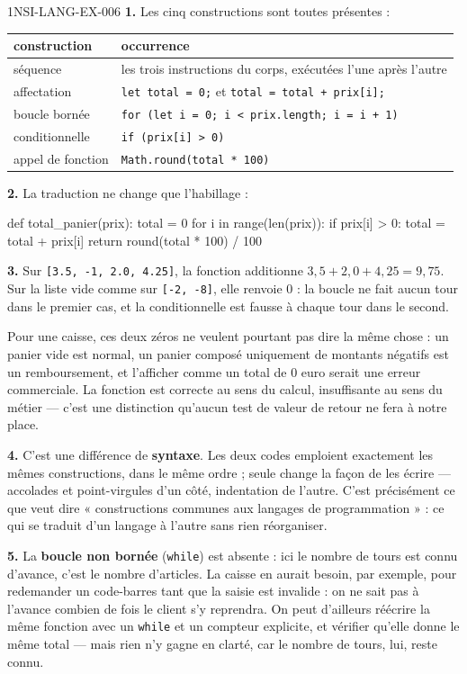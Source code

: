 \begin{corrige}{1NSI-LANG-EX-006}
\textbf{1.} Les cinq constructions sont toutes présentes :

\begin{center}
\begin{tabular}{ll}
\hline
construction & occurrence \\
\hline
séquence & les trois instructions du corps, exécutées l'une après l'autre \\
affectation & \lstinline{let total = 0;} et \lstinline{total = total + prix[i];} \\
boucle bornée & \lstinline{for (let i = 0; i < prix.length; i = i + 1)} \\
conditionnelle & \lstinline{if (prix[i] > 0)} \\
appel de fonction & \lstinline{Math.round(total * 100)} \\
\hline
\end{tabular}
\end{center}

\textbf{2.} La traduction ne change que l'habillage :
\begin{python}
def total_panier(prix):
    total = 0
    for i in range(len(prix)):
        if prix[i] > 0:
            total = total + prix[i]
    return round(total * 100) / 100
\end{python}

\textbf{3.} Sur \lstinline{[3.5, -1, 2.0, 4.25]}, la fonction additionne
$3{,}5+2{,}0+4{,}25=9{,}75$. Sur la liste vide comme sur
\lstinline{[-2, -8]}, elle renvoie $0$ : la boucle ne fait aucun tour dans le
premier cas, et la conditionnelle est fausse à chaque tour dans le second.

Pour une caisse, ces deux zéros ne veulent pourtant pas dire la même chose : un
panier vide est normal, un panier composé uniquement de montants négatifs est
un remboursement, et l'afficher comme un total de $0$ euro serait une erreur
commerciale. La fonction est correcte au sens du calcul, insuffisante au sens du
métier — c'est une distinction qu'aucun test de valeur de retour ne fera à notre
place.

\textbf{4.} C'est une différence de \textbf{syntaxe}. Les deux codes emploient
exactement les mêmes constructions, dans le même ordre ; seule change la façon
de les écrire — accolades et point-virgules d'un côté, indentation de l'autre.
C'est précisément ce que veut dire « constructions communes aux langages de
programmation » : ce qui se traduit d'un langage à l'autre sans rien
réorganiser.

\textbf{5.} La \textbf{boucle non bornée} (\lstinline{while}) est absente : ici
le nombre de tours est connu d'avance, c'est le nombre d'articles. La caisse en
aurait besoin, par exemple, pour redemander un code-barres tant que la saisie
est invalide : on ne sait pas à l'avance combien de fois le client s'y
reprendra. On peut d'ailleurs réécrire la même fonction avec un
\lstinline{while} et un compteur explicite, et vérifier qu'elle donne le même
total — mais rien n'y gagne en clarté, car le nombre de tours, lui, reste connu.
\end{corrige}
